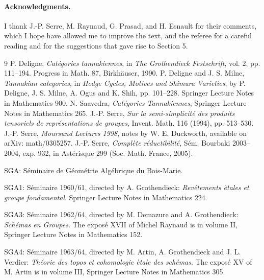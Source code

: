 \documentclass[11pt]{article}
\theoremstyle{plain}
\theoremstyle{definition}
\begin{document}
\paragraph{Acknowledgments.} I thank J.-P. Serre, M. Raynaud, G. Prasad, and H. Esnault for their comments, which I hope have allowed me to improve the text, and the referee for a careful reading and for the suggestions that gave rise to Section 5.

\begin{thebibliography}{9}
 P. Deligne, \emph{Cat\'egories tannakiennes}, in \emph{The Grothendieck Festschrift}, vol. 2, pp. 111--194. Progress in Math. 87, Birkh\"auser, 1990.
 P. Deligne and J. S. Milne, \emph{Tannakian categories}, in \emph{Hodge Cycles, Motives and Shimura Varieties}, by P. Deligne, J. S. Milne, A. Ogus and K. Shih, pp. 101--228. Springer Lecture Notes in Mathematics 900.
 N. Saavedra, \emph{Cat\'egories Tannakiennes}, Springer Lecture Notes in Mathematics 265.
 J.-P. Serre, \emph{Sur la semi-simplicit\'e des produits tensoriels de repr\'esentations de groupes}, Invent. Math. 116 (1994), pp. 513--530.
 J.-P. Serre, \emph{Moursund Lectures 1998}, notes by W. E. Duckworth, available on arXiv: math/0305257.
 J.-P. Serre, \emph{Compl\`ete r\'eductibilit\'e}, S\'em. Bourbaki 2003--2004, exp. 932, in Ast\'erisque 299 (Soc. Math. France, 2005).
\end{thebibliography}

\noindent SGA: S\'eminaire de G\'eom\'etrie Alg\'ebrique du Bois-Marie.

\noindent SGA1: S\'eminaire 1960/61, directed by A. Grothendieck: \emph{Rev\^etements \`etales et groupe fondamental}. Springer Lecture Notes in Mathematics 224.

\noindent SGA3: S\'eminaire 1962/64, directed by M. Demazure and A. Grothendieck: \emph{Sch\'emas en Groupes}. The expos\'e XVII of Michel Raynaud is in volume II, Springer Lecture Notes in Mathematics 152.

\noindent SGA4: S\'eminaire 1963/64, directed by M. Artin, A. Grothendieck and J. L. Verdier: \emph{Th\'eorie des topos et cohomologie \`etale des sch\'emas}. The expos\'e XV of M. Artin is in volume III, Springer Lecture Notes in Mathematics 305.
\end{document}
